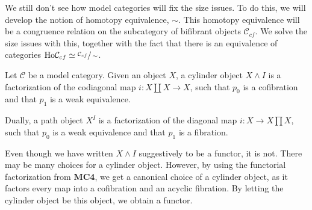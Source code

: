 \documentclass[../thesis.tex]{subfiles}
\begin{document}
            We still don't see how model categories will fix the size issues. To do this, we will develop the notion of homotopy equivalence, $\sim$. This homotopy equivalence will be a congruence relation on the subcategory of bifibrant objects $\mathcal{C}_{cf}$. We solve the size issues with this, together with the fact that there is an equivalence of categories $\text{Ho}\mathcal{C}_{cf}\simeq \sfrac{\mathcal{C}_{cf}}{\sim}$.

            \begin{definition}
                Let $\mathcal{C}$ be a model category. Given an object $X$, a cylinder object $X\wedge I$ is a factorization of the codiagonal map $i: X\coprod X \rightarrow X$, such that $p_0$ is a cofibration and that $p_1$ is a weak equivalence. 
                
                \begin{center}
                \end{center}

                Dually, a path object  $X^{I}$ is a factorization of the diagonal map $i: X \rightarrow X\prod X$, such that $p_0$ is a weak equivalence and that $p_1$ is a fibration.
                
                \begin{center}
                \end{center}
            \end{definition}

            \begin{remark}
                Even though we have written $X\wedge I$ suggestively to be a functor, it is not. There may be many choices for a cylinder object. However, by using the functorial factorization from \textbf{MC4}, we get a canonical choice of a cylinder object, as it factors every map into a cofibration and an acyclic fibration. By letting the cylinder object be this object, we obtain a functor.
            \end{remark}
\end{document}
